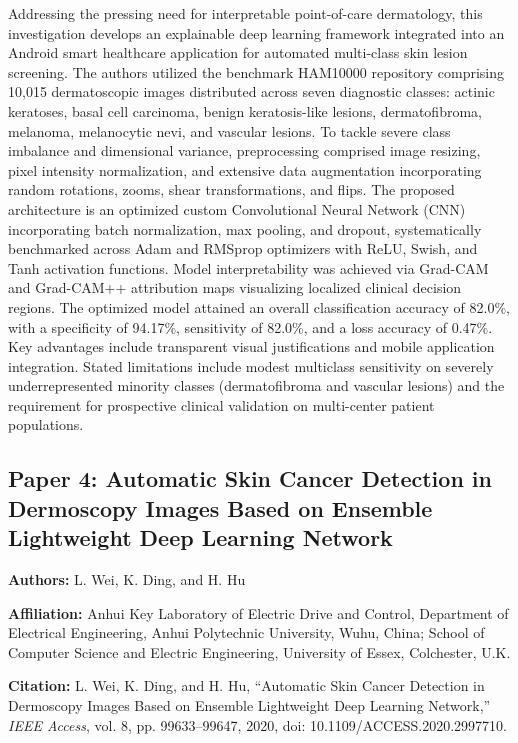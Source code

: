 \documentclass[conference]{IEEEtran}
\begin{document}
Addressing the pressing need for interpretable point-of-care dermatology, this investigation develops an explainable deep learning framework integrated into an Android smart healthcare application for automated multi-class skin lesion screening. The authors utilized the benchmark HAM10000 repository comprising 10,015 dermatoscopic images distributed across seven diagnostic classes: actinic keratoses, basal cell carcinoma, benign keratosis-like lesions, dermatofibroma, melanoma, melanocytic nevi, and vascular lesions. To tackle severe class imbalance and dimensional variance, preprocessing comprised image resizing, pixel intensity normalization, and extensive data augmentation incorporating random rotations, zooms, shear transformations, and flips. The proposed architecture is an optimized custom Convolutional Neural Network (CNN) incorporating batch normalization, max pooling, and dropout, systematically benchmarked across Adam and RMSprop optimizers with ReLU, Swish, and Tanh activation functions. Model interpretability was achieved via Grad-CAM and Grad-CAM++ attribution maps visualizing localized clinical decision regions. The optimized model attained an overall classification accuracy of 82.0\%, with a specificity of 94.17\%, sensitivity of 82.0\%, and a loss accuracy of 0.47\%. Key advantages include transparent visual justifications and mobile application integration. Stated limitations include modest multiclass sensitivity on severely underrepresented minority classes (dermatofibroma and vascular lesions) and the requirement for prospective clinical validation on multi-center patient populations.

\subsection{Paper 4: Automatic Skin Cancer Detection in Dermoscopy Images Based on Ensemble Lightweight Deep Learning Network}

\textbf{Authors:} L. Wei, K. Ding, and H. Hu

\textbf{Affiliation:} Anhui Key Laboratory of Electric Drive and Control, Department of Electrical Engineering, Anhui Polytechnic University, Wuhu, China; School of Computer Science and Electric Engineering, University of Essex, Colchester, U.K.

\textbf{Citation:} L. Wei, K. Ding, and H. Hu, ``Automatic Skin Cancer Detection in Dermoscopy Images Based on Ensemble Lightweight Deep Learning Network,'' \textit{IEEE Access}, vol. 8, pp. 99633--99647, 2020, doi: 10.1109/ACCESS.2020.2997710.
\end{document}
